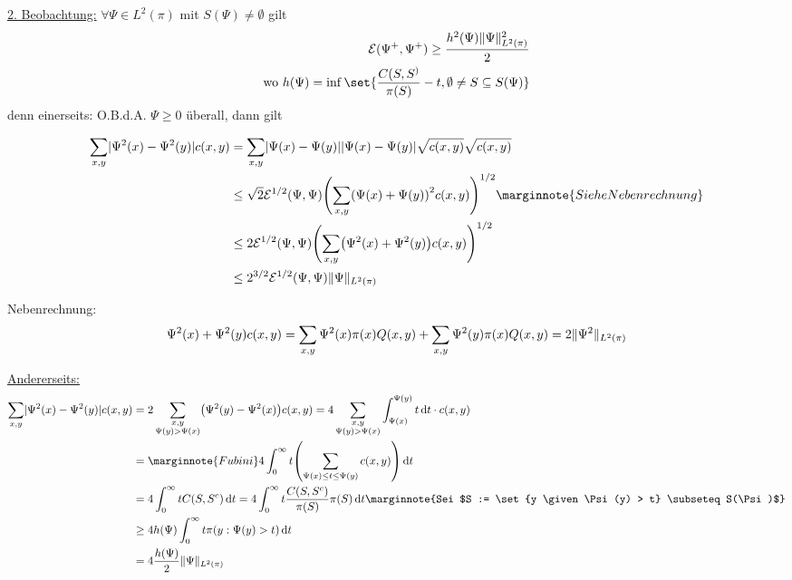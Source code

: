\begin{beweis}
	\underline{2. Beobachtung:} $\forall \Psi \in L^2(\pi)$ mit $S(\Psi) \neq \emptyset$ gilt
	\begin{align}
		\mathcal{E} (\Psi^+,\Psi^+) \geq \frac{h^2(\Psi) \Norm{\Psi}^2_{L^2(\pi)}}{2} \\
		\text{wo } h(\Psi) = \inf \set{ \frac{C(S,S^)}{\pi(S)} - t, \emptyset \neq S \subseteq S(\Psi)  }
	\end{align}
	denn einerseits: O.B.d.A. $\Psi \geq 0$ überall, dann gilt
	
	\begin{align}
		\sum\limits_{x,y} \abs{\Psi^2(x) - \Psi^2(y)} c(x,y) &= \sum\limits_{x,y} \abs{\Psi(x) - \Psi(y)} \abs{\Psi(x) - \Psi(y)} \sqrt{c(x,y)} \sqrt{c(x,y)} \\
		&\leq \sqrt{2} \mathcal{E}^{1/2} (\Psi,\Psi) \enb{\sum\limits_{x,y}\enb{\Psi(x) + \Psi(y)}^2 c(x,y) }^{1/2} \marginnote{Siehe Nebenrechnung}\\
		&\leq 2 \mathcal{E}^{1/2}(\Psi,\Psi) \enb{\sum\limits_{x,y} \enb{\Psi^2(x) + \Psi^2(y) } c(x,y) }^{1/2} \\
		&\leq 2^{3/2} \mathcal{E}^{1/2} (\Psi,\Psi) \Norm{ \Psi }_{L^2(\pi)}
	\end{align}
	
	Nebenrechnung: 
	\begin{align}
		\Psi^2(x) + \Psi^2(y) c(x,y) = \sum\limits_{x,y} \Psi^2(x) \pi(x) Q(x,y) + \sum\limits_{x,y} \Psi^2(y) \pi(x) Q(x,y) = 2 \lVert\Psi^2\rVert_{L^2(\pi)}
	\end{align}
	
	\underline{Andererseits:} 
	\begin{align}
		\sum\limits_{x,y} \abs{\Psi^2(x) - \Psi^2(y)}c(x,y) &= 2 \sum\limits_{\substack{x,y \\ \Psi(y) > \Psi(x)}} \enb{\Psi^2(y) - \Psi^2(x)} c(x,y) = 4 \sum\limits_{\substack{x,y \\ \Psi(y) > \Psi(x)}} \int_{\Psi(x)}^{\Psi(y)} t \diff t \cdot c(x,y) \\
		&= \marginnote{Fubini} 4 \int_{0}^{\infty} t\enb{\sum\limits_{\Psi(x) \leq t \leq \Psi(y)} c(x,y) } \diff t \\
		&= 4 \int_{0}^{\infty} t C(S,S^c) \diff t = 4 \int_{0}^{\infty} t \frac{C(S,S^c)}{\pi(S)} \pi(S) \diff t \marginnote{Sei $S := \set{y \given \Psi(y) > t} \subseteq S(\Psi)$} \\
		&\geq 4h(\Psi) \int_{0}^{\infty} t \pi(y : \Psi(y) > t) \diff t \\
		&= 4 \frac{h(\Psi)}{2} \Norm{ \Psi }_{L^2(\pi)}
	\end{align}		


\end{beweis}
